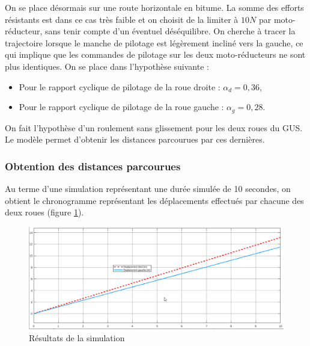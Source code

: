 On se place désormais sur une route horizontale en bitume. La somme des efforts résistants est dans ce cas très faible et on choisit de la limiter à $10N$ par moto-réducteur, sans tenir compte d'un éventuel déséquilibre. On cherche à tracer la trajectoire lorsque le manche de pilotage est légèrement incliné vers la gauche, ce qui implique que les commandes de pilotage sur les deux moto-réducteurs ne sont plus identiques. On se place dans l'hypothèse suivante :
\begin{itemize}
 \item Pour le rapport cyclique de pilotage de la roue droite : $\alpha_d= 0,36$,
 \item Pour le rapport cyclique de pilotage de la roue gauche : $\alpha_g=0,28$.
\end{itemize}

On fait l'hypothèse d'un roulement sans glissement pour les deux roues du GUS. Le modèle permet d'obtenir les distances parcourues par ces dernières.

\subsubsection{Obtention des distances parcourues}

Au terme d'une simulation représentant une durée simulée de 10 secondes, on obtient le chronogramme représentant les déplacements effectués par chacune des deux roues (figure \ref{fig10}).

\begin{figure}[ht!]
\centering\includegraphics[width=\linewidth]{img/fig10}
\caption{\label{fig10}Résultats de la simulation}
\end{figure}

